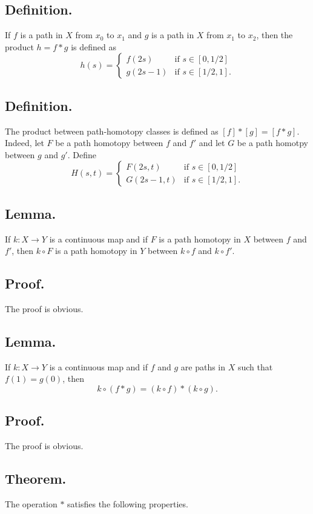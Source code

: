 \documentclass[titlepage]{article}
\begin{document}
\subsection{Definition.} If $f$ is a path in $X$ from $x_{0}$ to $x_{1}$ and $g$ is a path in $X$ from $x_{1}$ to $x_{2}$, then the product $h = f * g$ is defined as 
$$h(s) = \begin{cases}
f(2s) & \text{if } s \in [0, 1/2] \\
g(2s - 1) & \text{if } s \in [1/2, 1].
\end{cases}$$

\subsection{Definition.} The product between path-homotopy classes is defined as $[f] * [g] = [f * g]$. Indeed, let $F$ be a path homotopy between $f$ and $f'$ and let $G$ be a path homotpy between $g$ and $g'$. Define 
$$H(s, t) = \begin{cases}
    F(2s, t) & \text{if } s \in [0, 1/2] \\
    G(2s - 1, t) & \text{if } s \in [1/2, 1].
\end{cases}$$

\subsection{Lemma.} If $k: X \to Y$ is a continuous map and if $F$ is a path homotopy in $X$ between $f$ and $f'$, then $k \circ F$ is a path homotopy in $Y$ between $k \circ f$ and $k \circ f'$.

\subsection{Proof.} The proof is obvious.

\subsection{Lemma.} If $k: X \to Y$ is a continuous map and if $f$ and $g$ are paths in $X$ such that $f(1) = g(0)$, then 
$$k \circ (f * g) = (k \circ f) * (k \circ g).$$

\subsection{Proof.} The proof is obvious.

\subsection{Theorem.} The operation $*$ satisfies the following properties.
\end{document}
